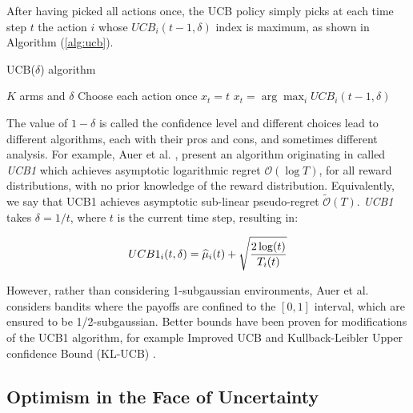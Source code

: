 After having picked all actions once, the \gls{UCB} policy simply picks at each time step $t$ the action $i$ whose $UCB_i(t-1,\delta)$ index is maximum, as shown in Algorithm (\ref{alg:ucb}).

\begin{algorithm}[t]
	\caption{\gls{UCB}($\delta$) algorithm}
	\label{alg:ucb}
	\begin{algorithmic}[1]
	 $K$ arms and $\delta$
	\State Choose each action once
			\State $x_{t} = t$
		\Else
			\State $x_t = \arg\max_i UCB_i(t-1, \delta)$
		\EndIf
	\EndFor
	\end{algorithmic}
\end{algorithm}


The value of $1-\delta$ is called the confidence level and different choices lead to different algorithms, each with their pros and cons, and sometimes different analysis. For example, Auer et al. \cite{auer2002finite}, present an algorithm originating in \cite{agrawal1995continuum} called \emph{UCB1} which achieves asymptotic logarithmic regret $\mathcal{O}(\log{T})$, for all reward distributions, with no prior knowledge of the reward distribution. Equivalently, we say that UCB1 achieves asymptotic sub-linear pseudo-regret $\widetilde{\mathcal{O}}(T)$. \emph{UCB1} takes $\delta=1/t$, where $t$ is the current time step, resulting in:

\begin{align}
UCB1_i(t, \delta) = \widehat{\mu}_i(t) + \sqrt{\frac{2\log(t)}{T_i(t)}}
\end{align}

However, rather than considering 1-subgaussian environments, Auer et al. \cite{auer2002finite} considers bandits where the payoffs are confined to the $[0,1]$ interval, which are ensured to be 1/2-subgaussian. Better bounds have been proven for modifications of the UCB1 algorithm, for example Improved UCB \cite{auer2010ucb} and Kullback-Leibler Upper confidence Bound (KL-UCB) \cite{garivier2011kl}.

\subsection{Optimism in the Face of Uncertainty}

